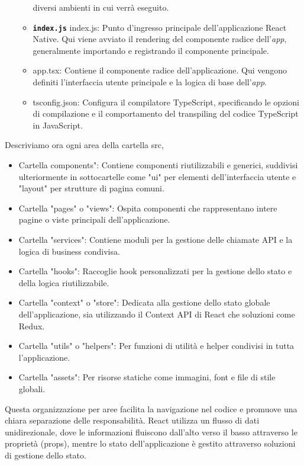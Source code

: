 \begin{itemize}
\begin{itemize}
                  diversi ambienti in cui verrà eseguito.
            \item \textbf{\texttt{index.js}} index.js: Punto d'ingresso principale dell'applicazione React Native. Qui viene 
                  avviato il rendering del componente radice dell'\textit{app}, generalmente importando e registrando il componente 
                  principale.
            \item app.tsx: Contiene il componente radice dell'applicazione. Qui vengono definiti l'interfaccia utente principale 
                  e la logica di base dell'\textit{app}.
            \item tsconfig.json: Configura il compilatore TypeScript, specificando le opzioni di compilazione e il comportamento del transpiling del codice TypeScript in JavaScript.
          \end{itemize}
\end{itemize}

Descriviamo ora ogni area della cartella src,
\begin{itemize}
      \item Cartella components": Contiene componenti riutilizzabili e generici, suddivisi ulteriormente in sottocartelle come "ui" per elementi dell'interfaccia utente e "layout" per strutture di pagina comuni.
      \item Cartella "pages" o "views": Ospita componenti che rappresentano intere pagine o viste principali dell'applicazione.
      \item Cartella "services": Contiene moduli per la gestione delle chiamate API e la logica di business condivisa.
      \item Cartella "hooks": Raccoglie hook personalizzati per la gestione dello stato e della logica riutilizzabile.
      \item Cartella "context" o "store": Dedicata alla gestione dello stato globale dell'applicazione, sia utilizzando il Context API di React che soluzioni come Redux.
      \item Cartella "utils" o "helpers": Per funzioni di utilità e helper condivisi in tutta l'applicazione.
      \item Cartella "assets": Per risorse statiche come immagini, font e file di stile globali.
\end{itemize}
Questa organizzazione per aree facilita la navigazione nel codice e promuove una chiara separazione delle responsabilità. 
React utilizza un flusso di dati unidirezionale, dove le informazioni fluiscono dall'alto verso il basso attraverso le 
proprietà (props), mentre lo stato dell'applicazione è gestito attraverso soluzioni di gestione dello stato.
